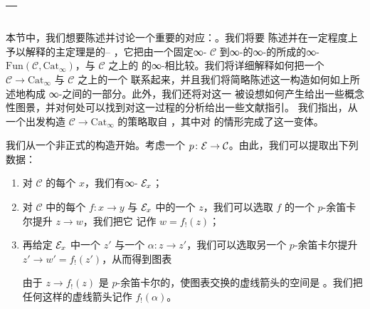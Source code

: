 \section{\trStraightening{}--\trUnstraightening}
\label{sec:straightening-unstraightening}

本节中，我们想要陈述并讨论一个重要的对应：\trGrothendieckConstruction{}。我们将要%
陈述并在一定程度上予以解释的主定理是\trLurie{}的\trStraightening{}--%
\trUnstraightening{}\trEquivalence{}，它把由一个固定∞-\trCategory{} $\mathcal{C}$
到∞-\trCategories{}的∞-\trCategory{}的\trFunctor{}所成的∞-\trCategory{}%
$\mathrm{Fun}(\mathcal{C}, \mathrm{Cat}_\infty)$，与 $\mathcal{C}$ 之上的%
\trCocartesianFibration{}的∞-\trCategory{}相比较。我们将详细解释如何把一个%
\trFunctor{} $\mathcal{C} \to \mathrm{Cat}_\infty$ 与 $\mathcal{C}$ 之上的一个%
\trCocartesianFibration{}联系起来，并且我们将简略陈述这一构造如何如上所述地构成%
∞-\trCategories{}之间\trEquivalence{}的一部分。此外，我们还将对这一\trEquivalence{}%
被设想如何产生给出一些概念性图景，并对何处可以找到对这一过程的分析给出一些文献指引。
我们指出，从一个\trCocartesianFibration{}出发构造\trFunctor{}%
$\mathcal{C} \to \mathrm{Cat}_\infty$ 的策略取自 \cite{Hau17}，其中对%
\trRightFibration{}的情形完成了这一变体。

我们从一个非正式的构造开始。考虑一个\trCocartesianFibration{}%
$p\colon \mathcal{E} \to \mathcal{C}$。由此，我们可以提取出下列数据：
\begin{enumerate}[label=(\arabic*)]
  \item 对 $\mathcal{C}$ 的每个\trObject{} $x$，我们有∞-\trCategory{} $\mathcal{E}_x$；
  \item 对 $\mathcal{C}$ 中的每个\trMorphism{} $f\colon x \to y$ 与 $\mathcal{E}_x$ 中的一个%
        \trObject{} $z$，我们可以选取 $f$ 的一个 $p$-余笛卡尔提升 $z \to w$，我们把它%
        记作 $w = f_!(z)$；
  \item 再给定 $\mathcal{E}_x$ 中一个\trObject{} $z'$ 与一个\trMorphism{}%
        $\alpha\colon z \to z'$，我们可以选取另一个 $p$-余笛卡尔提升
        $z' \to w' = f_!(z')$，从而得到图表
\begin{center}
\end{center}
        由于 $z \to f_!(z)$ 是 $p$-余笛卡尔的，使图表交换的虚线箭头的空间是%
        \trContractible。我们把任何这样的虚线箭头记作 $f_!(\alpha)$。
\end{enumerate}

